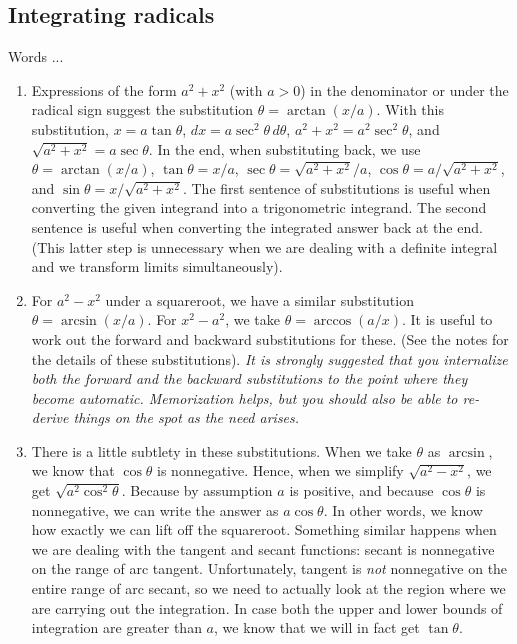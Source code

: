 \documentclass[10pt]{amsart}
\begin{document}
\subsection{Integrating radicals}
Words ...

\begin{enumerate}
\item Expressions of the form $a^2 + x^2$ (with $a > 0$) in the
  denominator or under the radical sign suggest the substitution
  $\theta = \arctan(x/a)$. With this substitution, $x = a \tan
  \theta$, $dx = a \sec^2 \theta \, d\theta$, $a^2 + x^2 = a^2 \sec^2
  \theta$, and $\sqrt{a^2 + x^2} = a \sec \theta$. In the end, when
  substituting back, we use $\theta = \arctan(x/a)$, $\tan \theta =
  x/a$, $\sec \theta = \sqrt{a^2 + x^2}/a$, $\cos \theta = a/\sqrt{a^2
  + x^2}$, and $\sin \theta = x/\sqrt{a^2 + x^2}$. The first sentence
  of substitutions is useful when converting the given integrand into
  a trigonometric integrand. The second sentence is useful when
  converting the integrated answer back at the end. (This latter step
  is unnecessary when we are dealing with a definite integral and we
  transform limits simultaneously).
\item For $a^2 - x^2$ under a squareroot, we have a similar
  substitution $\theta = \arcsin(x/a)$. For $x^2 - a^2$, we take
  $\theta = \arccos(a/x)$. It is useful to work out the forward and
  backward substitutions for these. (See the notes for the details of
  these substitutions). {\em It is strongly suggested that you
  internalize both the forward and the backward substitutions to the
  point where they become automatic. Memorization helps, but you
  should also be able to re-derive things on the spot as the need
  arises.}
\item There is a little subtlety in these substitutions. When we take
  $\theta$ as $\arcsin$, we know that $\cos \theta$ is
  nonnegative. Hence, when we simplify $\sqrt{a^2 - x^2}$, we get
  $\sqrt{a^2\cos^2 \theta}$. Because by assumption $a$ is positive,
  and because $\cos \theta$ is nonnegative, we can write the answer as
  $a\cos \theta$. In other words, we know how exactly we can lift off
  the squareroot. Something similar happens when we are dealing with
  the tangent and secant functions: secant is nonnegative on the range
  of arc tangent. Unfortunately, tangent is {\em not} nonnegative on
  the entire range of arc secant, so we need to actually look at the
  region where we are carrying out the integration. In case both the
  upper and lower bounds of integration are greater than $a$, we know
  that we will in fact get $\tan \theta$.
\end{enumerate}
\end{document}
